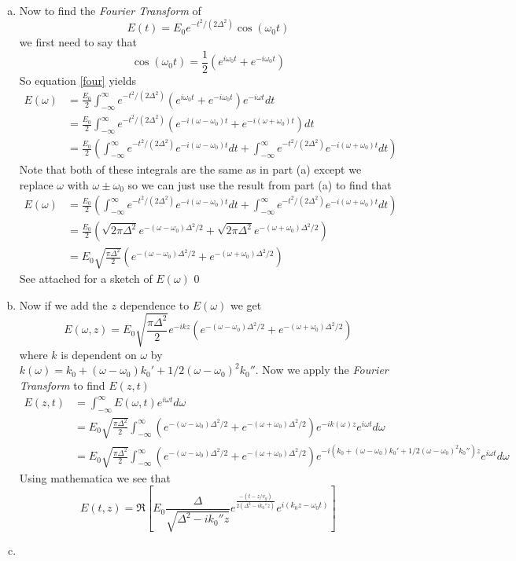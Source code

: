 \documentclass[11pt]{article}
\numberwithin{equation}{section}
\begin{document}
\begin{enumerate}[(a)]
\item
Now to find the \emph{Fourier Transform} of
$$E(t) = E_0e^{-t^2/(2\Delta^2)}\cos(\omega_0t)$$
we first need to say that 
$$\cos(\omega_0t) = \frac{1}{2}(e^{i\omega_0t}+e^{-i\omega_0t})$$
So equation \ref{four} yields 
\begin{align*}
E(\omega) &= \frac{E_0}{2}\int_{-\infty}^{\infty}e^{-t^2/(2\Delta^2)}(e^{i\omega_0t}+e^{-i\omega_0t})e^{-i\omega t}dt\\
&= \frac{E_0}{2}\int_{-\infty}^{\infty}e^{-t^2/(2\Delta^2)}(e^{-i(\omega-\omega_0)t}+e^{-i(\omega+\omega_0)t})dt\\
&= \frac{E_0}{2}\left(\int_{-\infty}^{\infty}e^{-t^2/(2\Delta^2)}e^{-i(\omega-\omega_0)t}dt+\int_{-\infty}^{\infty}e^{-t^2/(2\Delta^2)}e^{-i(\omega+\omega_0)t}dt\right)
\end{align*}
Note that both of these integrals are the same as in part (a) except we replace $\omega$ with $\omega\pm\omega_0$ so we can just use the result from part (a) to find that
\begin{align*}
E(\omega) &= \frac{E_0}{2}\left(\int_{-\infty}^{\infty}e^{-t^2/(2\Delta^2)}e^{-i(\omega-\omega_0)t}dt+\int_{-\infty}^{\infty}e^{-t^2/(2\Delta^2)}e^{-i(\omega+\omega_0)t}dt\right)\\
&= \frac{E_0}{2}\left(\sqrt{2\pi\Delta^2}e^{-(\omega-\omega_0)\Delta^2/2}+\sqrt{2\pi\Delta^2}e^{-(\omega+\omega_0)\Delta^2/2}\right)\\
&= E_0\sqrt{\frac{\pi\Delta^2}{2}}\left(e^{-(\omega-\omega_0)\Delta^2/2}+e^{-(\omega+\omega_0)\Delta^2/2}\right)
\end{align*}
See attached for a sketch of $E(\omega)$
0
\item
Now if we add the $z$ dependence to $E(\omega)$ we get
$$E(\omega,z) = E_0\sqrt{\frac{\pi\Delta^2}{2}}e^{-ikz}\left(e^{-(\omega-\omega_0)\Delta^2/2}+e^{-(\omega+\omega_0)\Delta^2/2}\right)$$
where $k$ is dependent on $\omega$ by $k(\omega) = k_0+(\omega-\omega_0)k_0'+1/2(\omega-\omega_0)^2k_0''$. Now we apply the \emph{Fourier Transform} to find $E(z,t)$
\begin{align*}
E(z,t) &= \int_{-\infty}^{\infty}E(\omega,t)e^{i\omega t}d\omega\\
&= E_0\sqrt{\frac{\pi\Delta^2}{2}}\int_{-\infty}^{\infty}\left(e^{-(\omega-\omega_0)\Delta^2/2}+e^{-(\omega+\omega_0)\Delta^2/2}\right)e^{-ik(\omega)z}e^{i\omega t}d\omega\\
&= E_0\sqrt{\frac{\pi\Delta^2}{2}}\int_{-\infty}^{\infty}\left(e^{-(\omega-\omega_0)\Delta^2/2}+e^{-(\omega+\omega_0)\Delta^2/2}\right)e^{-i(k_0+(\omega-\omega_0)k_0'+1/2(\omega-\omega_0)^2k_0'')z}e^{i\omega t}d\omega
\end{align*}
Using mathematica we see that
$$E(t,z) = \Re\left[E_0\frac{\Delta}{\sqrt{\Delta^2-ik_0''z}}e^{\frac{-(t-z/v_g)}{2(\Delta^2-ik_0''z)}}e^{i(k_0z-\omega_0t)}\right]$$

\item
\end{enumerate}
\end{document}

